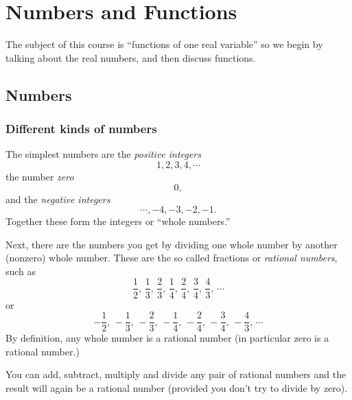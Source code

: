 
\chapter{Numbers and Functions}


The subject of this course is ``functions of one real variable'' so we
begin by talking about the real numbers, and then discuss functions.


\section{Numbers} 


\subsection{Different kinds of numbers} 
The simplest numbers are the \emph{positive integers}
\[
1, 2, 3, 4,\cdots
\]
the number \emph{zero}
\[
0,
\]
and the \emph{negative integers}
\[
\cdots,-4, -3, -2, -1.
\]
Together these form the integers or ``whole numbers.''



Next, there are the numbers you get by dividing one whole number by another
(nonzero) whole number.  These are the so called fractions or \emph{rational
  numbers}, such as
\[
\frac 12,\, \frac13,\, \frac23,\, \frac 14,\,\frac24,\,
\frac34,\, \frac43,\, \cdots
\]
or
\[
-\frac 12,\, -\frac13,\, -\frac23,\, -\frac 14,\,-\frac24,\,
-\frac34,\, -\frac43,\, \cdots
\]
By definition, any whole number is a rational number (in particular zero is a
rational number.)


You can add, subtract, multiply and divide any pair of rational numbers and the
result will again be a rational number (provided you don't try to divide by
zero).


